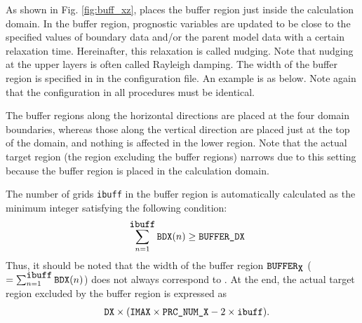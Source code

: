 As shown in Fig. \ref{fig:buff_xz}, \scalerm places the buffer region just inside the calculation domain. In the buffer region, prognostic variables are updated to be close to the specified values of boundary data and/or the parent model data with a certain relaxation time. Hereinafter, this relaxation is called nudging. Note that nudging at the upper layers is often called Rayleigh damping. The width of the buffer region is specified in  in the configuration file. An example is as below. Note again that the configuration in all procedures must be identical.


The buffer regions along the horizontal directions are placed at the four domain boundaries, whereas those along the vertical direction are placed just at the top of the domain, and nothing is affected in the lower region. Note that the actual target region (the region excluding the buffer regions) narrows due to this setting because the buffer region is placed in the calculation domain.

The number of grids \verb|ibuff| in the buffer region is automatically calculated as the minimum integer satisfying the following condition:
 \begin{eqnarray}
&&\sum_{n=1}^{\verb|ibuff|} \verb|BDX|(n) \ge \nmitemeq{BUFFER_DX} \nonumber
\end{eqnarray}
Thus, it should be noted that the width of the buffer region $\verb|BUFFER|_{\verb|X|}$ ($= \sum_{n=1}^{\verb|ibuff|} \verb|BDX|(n)$)  does not always correspond to . At the end, the actual target region excluded by the buffer region is expressed as
\begin{eqnarray}
&& \nmitemeq{DX} \times ( \nmitemeq{IMAX} \times \nmitemeq{PRC_NUM_X} - 2 \times \verb|ibuff| ).
\end{eqnarray}

